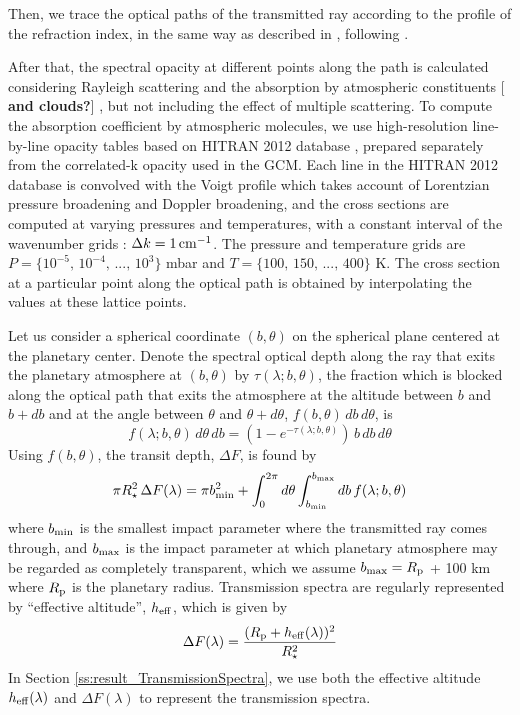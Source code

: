 \documentclass[11pt,numberedappendix,twocolappendix,]{emulateapj}
\def\memo#1{\color{red}$[${\bf #1}$]$ \color{black}}
\begin{document}
Then, we trace the optical paths of the transmitted ray according to the profile of the refraction index, in the same way as described in \citet{vanderWerf2008}, following \citet{Misra2014}. 

After that, the spectral opacity at different points along the path is calculated considering Rayleigh scattering and the absorption by atmospheric constituents \memo{and clouds?}, but not including the effect of multiple scattering. 
To compute the absorption coefficient by atmospheric molecules, we use high-resolution line-by-line opacity tables based on HITRAN 2012 database \citep{Rothman2013}, prepared separately from the correlated-k opacity used in the GCM. 
Each line in the HITRAN 2012 database is convolved with the Voigt profile which takes account of Lorentzian pressure broadening and Doppler broadening, 
and the cross sections are computed at varying pressures and temperatures, with a constant interval of the wavenumber grids : $\Delta k = 1\,{\rm cm}^{-1}$. 
The pressure and temperature grids are $P = \{10^{-5},\, 10^{-4},\,...,\,10^3\}$ mbar and $T = \{100,\, 150,\,...,\, 400\}$ K. 
The cross section at a particular point along the optical path is obtained by interpolating the values at these lattice points. 

Let us consider a spherical coordinate $(b, \theta )$ on the spherical plane centered at the planetary center. 
Denote the spectral optical depth along the ray that exits the planetary atmosphere at $(b, \theta )$ by $\tau (\lambda; b, \theta )$, 
the fraction which is blocked along the optical path that exits the atmosphere at the altitude between $b$ and $b+db$ and at the angle between $\theta $ and $\theta + d\theta $, $f(b, \theta ) \, db \, d\theta$, is 
\begin{equation}
f(\lambda; b, \theta ) \, d\theta \, db = ( 1 - e^{-\tau (\lambda; b, \theta )} ) \, b \, db \, d\theta 
\end{equation}
Using $f(b, \theta )$, the transit depth, $\Delta F$, is found by
\begin{equation}
\pi R_{\star } ^2 \, \Delta F (\lambda) = \pi b_{\rm min}^2 + \int_0^{2\pi} d\theta \int_{b_{\rm min}}^{b_{\rm max}} db \, f(\lambda; b, \theta )
\end{equation}
where $b_{\rm min}$ is the smallest impact parameter where the transmitted ray comes through, and $b_{\rm max}$ is the impact parameter at which planetary atmosphere may be regarded as completely transparent, which we assume $b_{\rm max} = R_{\rm p}$ + 100 km where $R_{\rm p}$ is the planetary radius. 
Transmission spectra are regularly represented by ``effective altitude'', $h_{\rm eff}$, which is given by
\begin{equation}
\Delta F(\lambda) = \frac{( R_{\rm p} + h_{\rm eff}(\lambda)  )^2}{R_{\star }^2}
\end{equation}
In Section \ref{ss:result_TransmissionSpectra}, we use both the effective altitude $h_{\rm eff}  (\lambda)$ and $\Delta F (\lambda)$ to represent the transmission spectra. 
\end{document}
